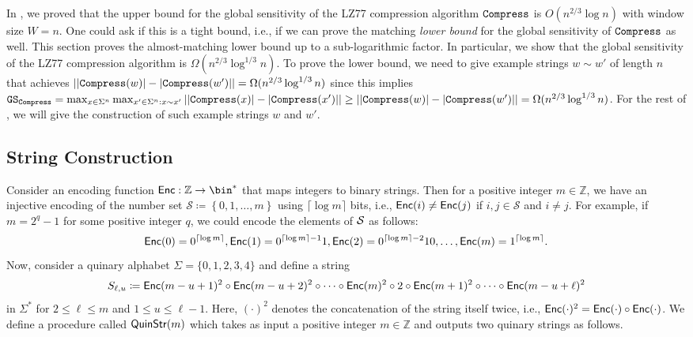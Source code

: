 In , we proved that the upper bound for the global sensitivity of the LZ77 compression algorithm $\compress$ is $O(n^{2/3}\log n)$ with window size $W=n$. One could ask if this is a tight bound, i.e., if we can prove the matching \emph{lower bound} for the global sensitivity of $\compress$ as well. This section proves the almost-matching lower bound up to a sub-logarithmic factor. In particular, we show that the global sensitivity of the LZ77 compression algorithm is $\Omega(n^{2/3}\log^{1/3} n)$. To prove the lower bound, we need to give example strings $w\sim w'$ of length $n$ that achieves $\left||\compress(w)|-|\compress(w')|\right|=\Omega(n^{2/3}\log^{1/3} n)$ since this implies $\GS_\compress=\max_{x \in \Sigma^n}\max_{x' \in \Sigma^n:x\sim x'} \left| |\compress(x)| - |\compress(x')| \right|\geq \left||\compress(w)|-|\compress(w')|\right|=\Omega(n^{2/3}\log^{1/3} n)$. 
For the rest of , we will give the construction of such example strings $w$ and $w'$.

\subsection{String Construction}

Consider an encoding function $\Enc:\mathbb{Z}\rightarrow\bin^*$ that maps integers to binary strings. Then for a positive integer $m\in\mathbb{Z}$, we have an injective encoding of the number set $\mathcal{S}\coloneqq\left\{0,1,\ldots, m\right\}$ using $\lceil\log m\rceil$ bits, i.e., $\Enc(i)\neq\Enc(j)$ if $i,j\in\mathcal{S}$ and $i\neq j$. For example, if $m=2^q-1$ for some positive integer $q$, we could encode the elements of $\S$ as follows: 
\[\Enc(0)=0^{\lceil\log m\rceil},\Enc(1)=0^{\lceil\log m\rceil-1}1,\Enc(2)=0^{\lceil\log m\rceil-2}10,\ldots,\Enc(m)=1^{\lceil\log m\rceil}.\] 
Now, consider a quinary alphabet $\Sigma=\{0,1,2,3,4\}$ and define a string
\[S_{\ell,u}\coloneqq\Enc(m-u+1)^2\circ\Enc(m-u+2)^2\circ\cdots\circ\Enc(m)^2\circ 2 \circ\Enc(m+1)^2\circ\cdots\circ\Enc(m-u+\ell)^2 \]
in $\Sigma^*$ for $2\leq\ell\leq m$ and $1\leq u\leq\ell-1$. 
Here, $(\cdot)^2$ denotes the concatenation of the string itself twice, i.e., $\Enc(\cdot)^2=\Enc(\cdot)\circ\Enc(\cdot)$. 
We define a procedure called $\QuinStr(m)$ which takes as input a positive integer $m\in\mathbb{Z}$ and outputs two quinary strings as follows.

